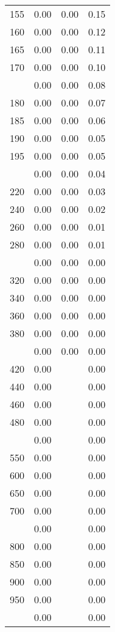 \begin{table}[ht]
\begin{tabular}{lccc}
  155 & 0.00 & 0.00 & 0.15 \\ 
  160 & 0.00 & 0.00 & 0.12 \\ 
  165 & 0.00 & 0.00 & 0.11 \\ 
  170 & 0.00 & 0.00 & 0.10 \\ 
   \addlinespace
175 & 0.00 & 0.00 & 0.08 \\ 
  180 & 0.00 & 0.00 & 0.07 \\ 
  185 & 0.00 & 0.00 & 0.06 \\ 
  190 & 0.00 & 0.00 & 0.05 \\ 
  195 & 0.00 & 0.00 & 0.05 \\ 
   \addlinespace
200 & 0.00 & 0.00 & 0.04 \\ 
  220 & 0.00 & 0.00 & 0.03 \\ 
  240 & 0.00 & 0.00 & 0.02 \\ 
  260 & 0.00 & 0.00 & 0.01 \\ 
  280 & 0.00 & 0.00 & 0.01 \\ 
   \addlinespace
300 & 0.00 & 0.00 & 0.00 \\ 
  320 & 0.00 & 0.00 & 0.00 \\ 
  340 & 0.00 & 0.00 & 0.00 \\ 
  360 & 0.00 & 0.00 & 0.00 \\ 
  380 & 0.00 & 0.00 & 0.00 \\ 
   \addlinespace
400 & 0.00 & 0.00 & 0.00 \\ 
  420 & 0.00 &  & 0.00 \\ 
  440 & 0.00 &  & 0.00 \\ 
  460 & 0.00 &  & 0.00 \\ 
  480 & 0.00 &  & 0.00 \\ 
   \addlinespace
500 & 0.00 &  & 0.00 \\ 
  550 & 0.00 &  & 0.00 \\ 
  600 & 0.00 &  & 0.00 \\ 
  650 & 0.00 &  & 0.00 \\ 
  700 & 0.00 &  & 0.00 \\ 
   \addlinespace
750 & 0.00 &  & 0.00 \\ 
  800 & 0.00 &  & 0.00 \\ 
  850 & 0.00 &  & 0.00 \\ 
  900 & 0.00 &  & 0.00 \\ 
  950 & 0.00 &  & 0.00 \\ 
   \addlinespace
1000 & 0.00 &  & 0.00 \\ 
   \bottomrule
\end{tabular}
\end{table}
